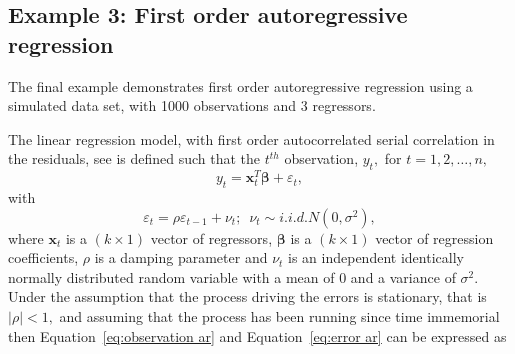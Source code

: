 \documentclass[article]{jss}
\begin{document}
\subsection{Example 3: First order autoregressive regression}
\label{sub:Example-3:-First}

The final example demonstrates first order autoregressive regression
using a simulated data set, with 1000 observations and 3 regressors.

The linear regression model, with first order autocorrelated serial
correlation in the residuals, see \citet{Zellner1971} is defined such
that the $t^{th}$ observation, $y_{t},$ for
$t=1,2,\dots,n,$
\begin{equation}
  y_{t}=\bm{x}_{t}^{T}\bm{\beta}+\varepsilon_{t},\label{eq:observation
    ar}
\end{equation} 
with
\begin{equation}
  \varepsilon_{t}=\rho\varepsilon_{t-1}+\nu_{t};\,\,\,\nu_{t}\sim
  i.i.d.N(0,\sigma^{2}),
\label{eq:error ar}
\end{equation} where
\textbf{$\bm{x}_{t}$} is a $\left(k\times1\right)$ vector of
regressors, $\bm{\beta}$ is a $\left(k\times1\right)$ vector of
regression coefficients, $\rho$ is a damping parameter and $\nu_{t}$
is an independent identically normally distributed random variable
with a mean of 0 and a variance of $\sigma^{2}.$ Under the assumption
that the process driving the errors is stationary, that is $|\rho|<1,$
and assuming that the process has been running since time immemorial
then Equation~\ref{eq:observation ar} and Equation~\ref{eq:error ar} can be
expressed as
\end{document}
